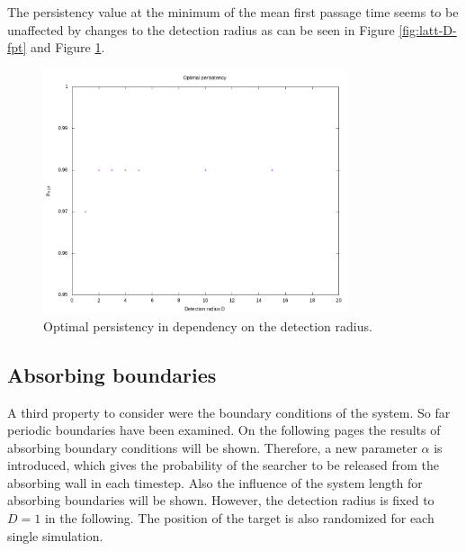 \documentclass[]{scrartcl}
\begin{document}
The persistency value at the minimum of the mean first passage time seems to be unaffected by changes to the detection radius as can be seen in Figure \ref{fig:latt-D-fpt} and Figure \ref{fig:latt-D-opt_p}.

\begin{figure}[!hbt]
 \centering
 \includegraphics[width=0.8\textwidth]{./fig/latt/D/p_opt.png}
 \caption{Optimal persistency in dependency on the detection radius.}
 \label{fig:latt-D-opt_p}
\end{figure}


\subsection{Absorbing boundaries}
\label{ssec:latt-alpha}

A third property to consider were the boundary conditions of the system. So far periodic boundaries have been examined. On the following pages the results of absorbing boundary conditions will be shown. Therefore, a new parameter $\alpha$ is introduced, which gives the probability of the searcher to be released from the absorbing wall in each timestep. Also the influence of the system length for absorbing boundaries will be shown. However, the detection radius is fixed to $D = 1$ in the following. The position of the target is also randomized for each single simulation.
\end{document}
